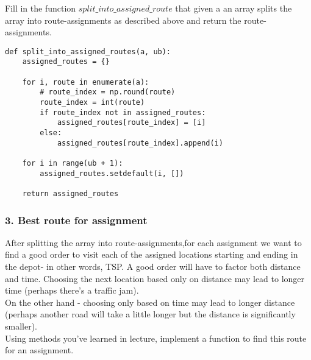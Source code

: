 \documentclass[letterpaper, 12pt]{article}
\begin{document}
Fill in the function $split\_into\_assigned\_route$ that given a an array splits the array into route-assignments as described above and return the route-assignments.

\begin{lstlisting}
def split_into_assigned_routes(a, ub):
    assigned_routes = {}

    for i, route in enumerate(a):
        # route_index = np.round(route)
        route_index = int(route)
        if route_index not in assigned_routes:
            assigned_routes[route_index] = [i]
        else:
            assigned_routes[route_index].append(i)

    for i in range(ub + 1):
        assigned_routes.setdefault(i, [])

    return assigned_routes

\end{lstlisting}

\subsubsection*{3. Best route for assignment}
After splitting the array into route-assignments,for each assignment we want to find a good order to visit each of the assigned locations starting and ending in the depot- in other words, TSP. A good order will have to factor both distance and time. Choosing the next location based only on distance may lead to longer time (perhaps there's a traffic jam). \\

On the other hand - choosing only based on time may lead to longer distance (perhaps another road will take a little longer but the distance is significantly smaller). \\

Using methods you've learned in lecture, implement a function to find this route for an assignment. \\
\end{document}
